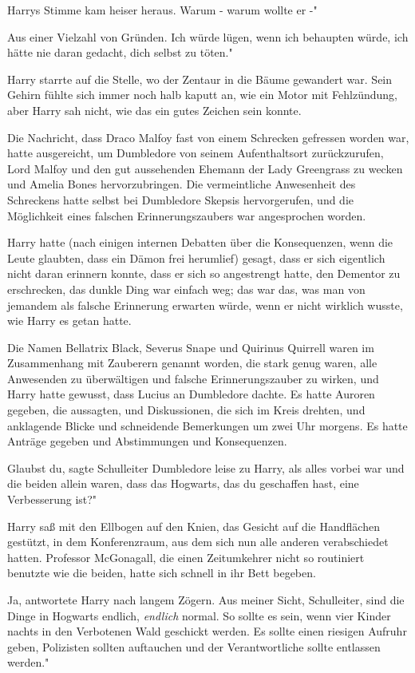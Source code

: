 Harrys Stimme kam heiser heraus. \glqq Warum - warum wollte er -"

\glqq Aus einer Vielzahl von Gründen. Ich würde lügen, wenn ich behaupten würde,
ich hätte nie daran gedacht, dich selbst zu töten."

Harry starrte auf die Stelle, wo der Zentaur in die Bäume gewandert war. Sein
Gehirn fühlte sich immer noch halb kaputt an, wie ein Motor mit Fehlzündung,
aber Harry sah nicht, wie das ein gutes Zeichen sein konnte.


Die Nachricht, dass Draco Malfoy fast von einem Schrecken gefressen worden war,
hatte ausgereicht, um Dumbledore von seinem Aufenthaltsort zurückzurufen, Lord
Malfoy und den gut aussehenden Ehemann der Lady Greengrass zu wecken und Amelia
Bones hervorzubringen. Die vermeintliche Anwesenheit des Schreckens hatte selbst
bei Dumbledore Skepsis hervorgerufen, und die Möglichkeit eines falschen
Erinnerungszaubers war angesprochen worden.

Harry hatte (nach einigen internen Debatten über die Konsequenzen, wenn die
Leute glaubten, dass ein Dämon frei herumlief) gesagt, dass er sich eigentlich
nicht daran erinnern konnte, dass er sich so angestrengt hatte, den Dementor zu
erschrecken, das dunkle Ding war einfach weg; das war das, was man von jemandem
als falsche Erinnerung erwarten würde, wenn er nicht wirklich wusste, wie Harry
es getan hatte.

Die Namen Bellatrix Black, Severus Snape und Quirinus Quirrell waren im
Zusammenhang mit Zauberern genannt worden, die stark genug waren, alle
Anwesenden zu überwältigen und falsche Erinnerungszauber zu wirken, und Harry
hatte gewusst, dass Lucius an Dumbledore dachte. Es hatte Auroren gegeben, die
aussagten, und Diskussionen, die sich im Kreis drehten, und anklagende Blicke
und schneidende Bemerkungen um zwei Uhr morgens. Es hatte Anträge gegeben und
Abstimmungen und Konsequenzen.

\glqq Glaubst du\grqq{}, sagte Schulleiter Dumbledore leise zu Harry, als alles
vorbei war und die beiden allein waren, \glqq dass das Hogwarts, das du
geschaffen hast, eine Verbesserung ist?"

Harry saß mit den Ellbogen auf den Knien, das Gesicht auf die Handflächen
gestützt, in dem Konferenzraum, aus dem sich nun alle anderen verabschiedet
hatten. Professor McGonagall, die einen Zeitumkehrer nicht so routiniert
benutzte wie die beiden, hatte sich schnell in ihr Bett begeben.

\glqq Ja\grqq{}, antwortete Harry nach langem Zögern. \glqq Aus meiner Sicht,
Schulleiter, sind die Dinge in Hogwarts endlich, \emph{endlich} normal. So
sollte es sein, wenn vier Kinder nachts in den Verbotenen Wald geschickt werden.
Es sollte einen riesigen Aufruhr geben, Polizisten sollten auftauchen und der
Verantwortliche sollte entlassen werden."


